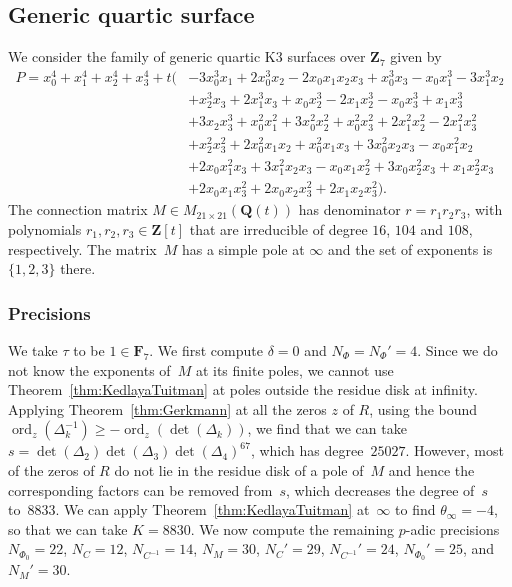 \documentclass[a4paper,11pt]{article}
\numberwithin{equation}{section}
\newcommand{\ZZ}{\mathbf{Z}} %
\newcommand{\QQ}{\mathbf{Q}} %
\newcommand{\FF}{\mathbf{F}} %
\DeclareMathOperator{\ord}{ord}          %
\theoremstyle{definition}
\begin{document}
\subsection{Generic quartic surface}

We consider the family of generic quartic K3 surfaces over $\ZZ_{7}$ given by 
\begin{equation*}
\begin{split}
P=x_0^4 + x_1^4 + x_2^4 + x_3^4 
+ t \bigl( & -3 x_0^3 x_1 + 2 x_0^3 x_2 - 2 x_0 x_1 x_2 x_3 + x_0^3 x_3 - x_0 x_1^3 - 3 x_1^3 x_2 \\ 
           & + x_2^3 x_3 + 2 x_1^3 x_3 + x_0 x_2^3 - 2 x_1 x_2^3 - x_0 x_3^3 + x_1 x_3^3 \\
           & + 3 x_2 x_3^3 + x_0^2 x_1^2 + 3 x_0^2 x_2^2 + x_0^2 x_3^2 + 2 x_1^2 x_2^2 - 2 x_1^2 x_3^2 \\
           & + x_2^2 x_3^2 + 2 x_0^2 x_1 x_2 + x_0^2 x_1 x_3 + 3 x_0^2 x_2 x_3 - x_0 x_1^2 x_2 \\
           & + 2 x_0 x_1^2 x_3 + 3 x_1^2 x_2 x_3 - x_0 x_1 x_2^2 + 3 x_0 x_2^2 x_3 + x_1 x_2^2 x_3 \\
           & + 2 x_0 x_1 x_3^2 + 2 x_0 x_2 x_3^2 + 2 x_1 x_2 x_3^2 \bigr).
\end{split}
\end{equation*}
The connection matrix $M \in M_{21 \times 21}(\QQ(t))$ has denominator 
$r = r_1 r_2 r_3$, with polynomials $r_1,r_2,r_3 \in \ZZ[t]$ that are 
irreducible of degree $16$, $104$ and $108$, respectively.  The matrix~$M$ 
has a simple pole at $\infty$ and the set of exponents is $\{1,2,3\}$ there.

\subsubsection{Precisions}

We take $\tau$ to be  $1 \in \FF_7$. We first compute $\delta=0$ and 
$N_{\Phi}=N_{\Phi}'=4$. Since we do not know the exponents of~$M$ at 
its finite poles, we cannot use Theorem~\ref{thm:KedlayaTuitman} at poles 
outside the residue disk at infinity. Applying Theorem~\ref{thm:Gerkmann} 
at all the zeros $z$ of $R$, using the bound 
$\ord_z(\Delta_k^{-1}) \geq -\ord_z(\det(\Delta_k))$, we find that we can 
take $s = \det(\Delta_2)\det(\Delta_3)\det(\Delta_4)^{67}$, which has 
degree~$25027$. However, most of the zeros of $R$ do not lie in the 
residue disk of a pole of~$M$ and hence the corresponding factors can 
be removed from~$s$, which decreases the degree of~$s$ to~$8833$.  
We can apply Theorem~\ref{thm:KedlayaTuitman} at~$\infty$ to find 
$\theta_{\infty}=-4$, so that we can take $K=8830$. We now compute 
the remaining $p$-adic precisions $N_{\Phi_0}=22$, $N_C=12$, $N_{C^{-1}}=14$, 
$N_M=30$, $N_C'=29$, $N_{C^{-1}}'=24$, $N_{\Phi_0}'=25$, and $N_M'=30$.
\end{document}
